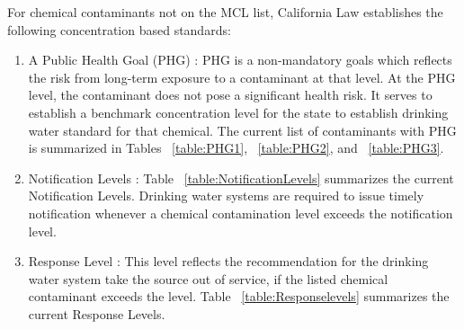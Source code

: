 For chemical contaminants not on the MCL list, California Law establishes the following concentration based standards:
\begin{enumerate}
\item A Public Health Goal (PHG) : PHG is a non-mandatory goals which reflects the risk from long-term exposure to a contaminant at that level. At the PHG level, the contaminant does not pose a significant health risk.  It serves to establish a benchmark concentration level for the state to establish drinking water standard for that chemical. The current list of contaminants with PHG is summarized in Tables ~\ref{table:PHG1}, ~\ref{table:PHG2}, and ~\ref{table:PHG3}.

\item Notification Levels :  Table ~\ref{table:NotificationLevels} summarizes the current Notification Levels.  Drinking water systems are required to issue timely notification whenever a chemical contamination level exceeds the notification level.

\item Response Level : This level reflects the recommendation for  the drinking water system take the source out of service, if the listed chemical contaminant exceeds the level.   Table ~\ref{table:Responselevels} summarizes the current Response Levels. 
\end{enumerate}


